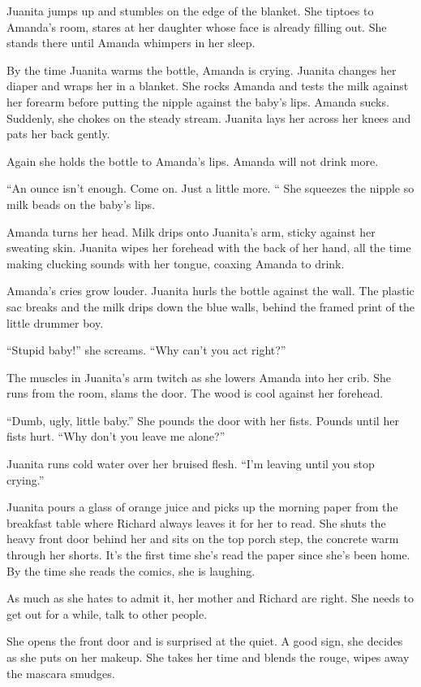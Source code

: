 \documentclass[
]{article}
\begin{document}
Juanita jumps up and stumbles on the edge of the blanket. She tiptoes to
Amanda's room, stares at her daughter whose face is already filling out.
She stands there until Amanda whimpers in her sleep.

By the time Juanita warms the bottle, Amanda is crying. Juanita changes
her diaper and wraps her in a blanket. She rocks Amanda and tests the
milk against her forearm before putting the nipple against the baby's
lips. Amanda sucks. Suddenly, she chokes on the steady stream. Juanita
lays her across her knees and pats her back gently.

Again she holds the bottle to Amanda's lips. Amanda will not drink more.

``An ounce isn't enough. Come on. Just a little more. `` She squeezes
the nipple so milk beads on the baby's lips.

Amanda turns her head. Milk drips onto Juanita's arm, sticky against her
sweating skin. Juanita wipes her forehead with the back of her hand, all
the time making clucking sounds with her tongue, coaxing Amanda to
drink.

Amanda's cries grow louder. Juanita hurls the bottle against the wall.
The plastic sac breaks and the milk drips down the blue walls, behind
the framed print of the little drummer boy.

``Stupid baby!'' she screams. ``Why can't you act right?''

The muscles in Juanita's arm twitch as she lowers Amanda into her crib.
She runs from the room, slams the door. The wood is cool against her
forehead.

``Dumb, ugly, little baby.'' She pounds the door with her fists. Pounds
until her fists hurt. ``Why don't you leave me alone?''

Juanita runs cold water over her bruised flesh. ``I'm leaving until you
stop crying.''

Juanita pours a glass of orange juice and picks up the morning paper
from the breakfast table where Richard always leaves it for her to read.
She shuts the heavy front door behind her and sits on the top porch
step, the concrete warm through her shorts. It's the first time she's
read the paper since she's been home. By the time she reads the comics,
she is laughing.

As much as she hates to admit it, her mother and Richard are right. She
needs to get out for a while, talk to other people.

She opens the front door and is surprised at the quiet. A good sign, she
decides as she puts on her makeup. She takes her time and blends the
rouge, wipes away the mascara smudges.
\end{document}
